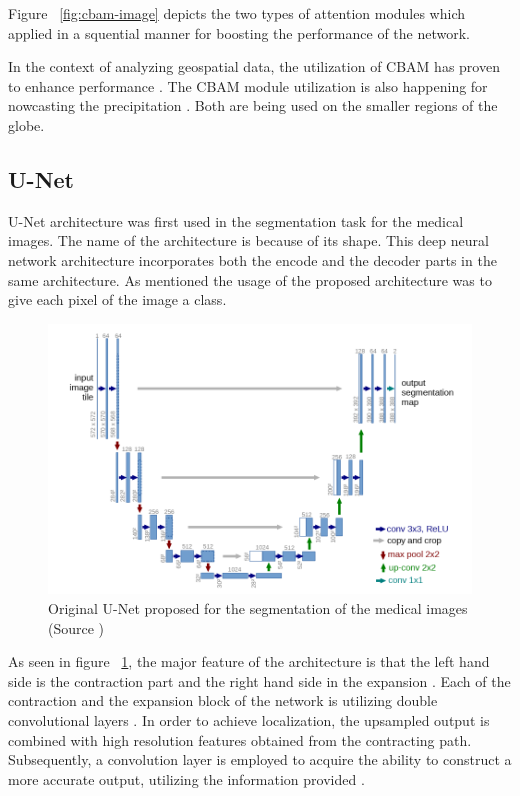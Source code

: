 Figure ~\ref{fig:cbam-image} depicts the two types of attention modules which applied in a squential manner for boosting the performance of the network\cite{woo2018cbam}.

In the context of analyzing geospatial data, the utilization of CBAM has proven to enhance performance \cite{mao2023reconstructing}.
The CBAM module utilization is also happening for nowcasting the precipitation \cite{trebing2021smaatunet}. Both \cite{mao2023reconstructing} \cite{trebing2021smaatunet} are being used on the smaller regions of the globe.

\subsection{U-Net}

U-Net architecture was first used in the segmentation task for the medical images. The name of the architecture is because of its shape. This deep neural network architecture incorporates both the encode and the decoder parts in the same architecture. As mentioned the usage of the proposed architecture was to give each pixel of the image a class.


\begin{figure}[h]
    \centering
    \includegraphics[width=1.0\linewidth]{figures/chapter-4/unet.png}
    \caption{Original U-Net proposed for the segmentation of the medical images (Source \cite{ronneberger2015unet}) }
    \label{fig:unet}
\end{figure}

As seen in figure ~\ref{fig:unet}, the major feature of the architecture is that the left hand side is the contraction part and the right hand side in the expansion \cite{ronneberger2015unet}. Each of the contraction and the expansion block of the network is utilizing double convolutional layers \cite{ronneberger2015unet}.
In order to achieve localization, the upsampled output is combined with high resolution features obtained from the contracting path. Subsequently, a convolution layer is employed to acquire the ability to construct a more accurate output, utilizing the information provided \cite{ronneberger2015unet}.

